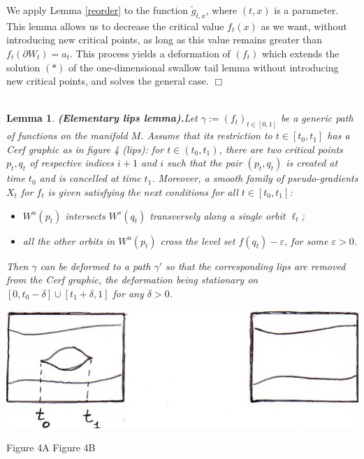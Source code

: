 \documentclass[12pt]{amsart}
\newtheorem{lemme}[thm]{Lemma}
\def\ga{\gamma}
\def\de{\delta}
\def\ep{\varepsilon}
\def\bull{\hfill$\Box$\\}
\begin{document}
 We apply Lemma \ref{reorder} to the function $\tilde g_{t,x}$, where $(t,x)$ is a parameter.
 This lemma allows us to decrease the critical value $f_t(x)$ as we want, 
  without introducing new critical points, as long as this value remains greater than 
  $f_t(\partial W_t)= a_t$. This process yields a deformation of $\left(f_t\right)$
  which extends the solution $(*)$ of the one-dimensional swallow tail lemma
  without introducing new critical points, and solves the general case. \bull\\
  
  
   \begin{lemme}{\bf (Elementary lips lemma).}\label{lips}
   Let $\ga:=\left(f_t\right)_{t\in [0,1]}$ be a generic path of functions on the manifold $M$.
Assume that its restriction to $t\in [t_0,t_1]$ has a Cerf graphic 
 as in figure 4 \emph{(lips)}:  for $t\in (t_0,t_1)$, there are two critical points $p_t, q_t$ of respective indices
 $i+1$ and $i$
such that the pair $(p_t,q_t)$ is created at time   $t_0$  and is cancelled at time $t_1$.
Moreover, a smooth family of pseudo-gradients $X_t$ for $f_t$ is given satisfying the next
conditions for all $t\in [t_0,t_1]$:
  \begin{itemize}
  \item $W^u(p_t)$ intersects $W^s(q_t)$ transversely   along 
a single orbit $\ell_t$;
\item all the other orbits  in $W^u(p_t)$  cross the  level set   $f(q_t)-\ep$,
for some $\ep>0$.
\end{itemize}
   Then $\ga$ can be deformed  
  to a path $\ga'$ so that the corresponding  lips are removed from the  Cerf graphic, the deformation being stationary on $[0, t_0-\de]\cup [t_1+\de, 1]$
 for any $\de>0$. \\
  \end{lemme} 
   \begin{center}
  \parbox[t]{15cm}{
\hspace{4cm} \includegraphics*[scale=0.5]{reidemeister_lips-092.jpg}

\centerline{Figure 4A \hskip 2.5cm Figure 4B}
}
\end{center}
\vskip 1cm
  
\end{document}
